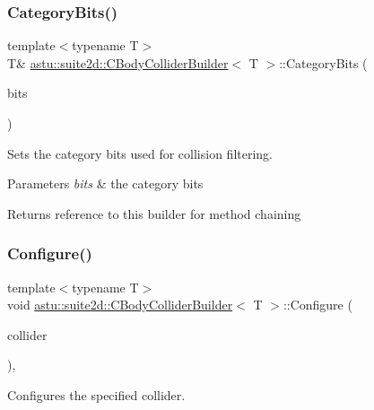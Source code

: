 \subsubsection{\texorpdfstring{Category\+Bits()}{CategoryBits()}}
{\footnotesize\ttfamily template$<$typename T$>$ \\
T\& \hyperlink{classastu_1_1suite2d_1_1CBodyColliderBuilder}{astu\+::suite2d\+::\+C\+Body\+Collider\+Builder}$<$ T $>$\+::Category\+Bits (\begin{DoxyParamCaption}\item[{uint16\+\_\+t}]{bits }\end{DoxyParamCaption})\hspace{0.3cm}{\ttfamily [inline]}}

Sets the category bits used for collision filtering.


\begin{DoxyParams}{Parameters}
{\em bits} & the category bits \\
\hline
\end{DoxyParams}
\begin{DoxyReturn}{Returns}
reference to this builder for method chaining 
\end{DoxyReturn}
\mbox{\label{classastu_1_1suite2d_1_1CBodyColliderBuilder_a64b45a603701bd29ae6cb631258acfe7}} 
\subsubsection{\texorpdfstring{Configure()}{Configure()}}
{\footnotesize\ttfamily template$<$typename T$>$ \\
void \hyperlink{classastu_1_1suite2d_1_1CBodyColliderBuilder}{astu\+::suite2d\+::\+C\+Body\+Collider\+Builder}$<$ T $>$\+::Configure (\begin{DoxyParamCaption}\item[{\hyperlink{classastu_1_1suite2d_1_1CBodyCollider}{C\+Body\+Collider} \&}]{collider }\end{DoxyParamCaption})\hspace{0.3cm}{\ttfamily [inline]}, {\ttfamily [protected]}}

Configures the specified collider.


